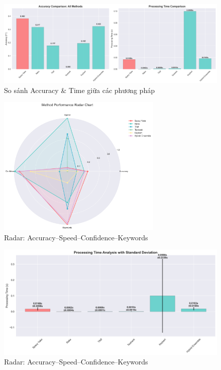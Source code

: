 \begin{figure}[htbp]
  \centering
  \includegraphics[width=\textwidth]{keyword-contents/experiment_visualizations/performance_comparison.png}
  \caption{So sánh Accuracy \& Time giữa các phương pháp}
  \label{fig:domains}
\end{figure}

\begin{figure}[htbp]
  \centering
    \includegraphics[width=0.7\textwidth]{keyword-contents/experiment_visualizations/radar_chart.png}
    \caption{Radar: Accuracy–Speed–Confidence–Keywords}
  \label{fig:overall}
\end{figure}
\newpage

\begin{figure}[htbp]
  \centering
    \includegraphics[width=\textwidth]{keyword-contents/experiment_visualizations/processing_time_analysis.png}
    \caption{Radar: Accuracy–Speed–Confidence–Keywords}
  \label{fig:overall}
\end{figure}

